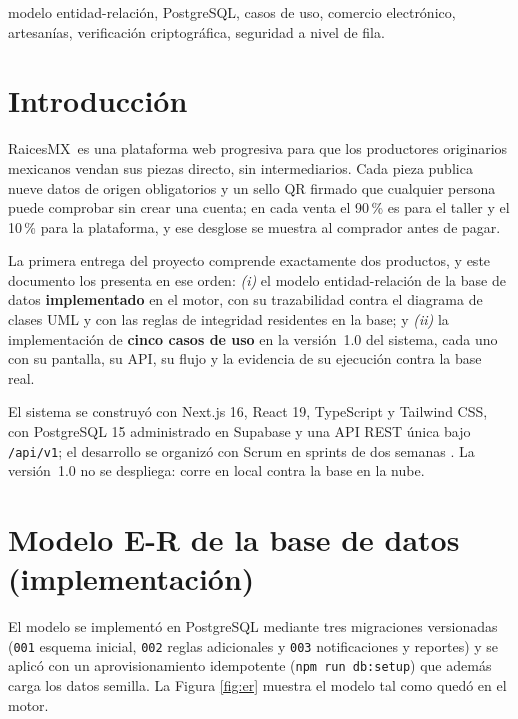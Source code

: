 \documentclass[conference,letterpaper,onecolumn]{IEEEtran}
\newcommand{\Proyecto}{RaicesMX}
\begin{document}
\begin{IEEEkeywords}
modelo entidad-relación, PostgreSQL, casos de uso, comercio electrónico, artesanías,
verificación criptográfica, seguridad a nivel de fila.
\end{IEEEkeywords}

\section{Introducción}

\Proyecto\ es una plataforma web progresiva para que los productores originarios
mexicanos vendan sus piezas directo, sin intermediarios. Cada pieza publica nueve
datos de origen obligatorios y un sello QR firmado que cualquier persona puede
comprobar sin crear una cuenta; en cada venta el 90\,\% es para el taller y el
10\,\% para la plataforma, y ese desglose se muestra al comprador antes de pagar.

La primera entrega del proyecto comprende exactamente dos productos, y este documento
los presenta en ese orden: \emph{(i)} el modelo entidad-relación de la base de datos
\textbf{implementado} en el motor, con su trazabilidad contra el diagrama de clases
UML y con las reglas de integridad residentes en la base; y \emph{(ii)} la
implementación de \textbf{cinco casos de uso} en la versión~1.0 del sistema, cada uno
con su pantalla, su API, su flujo y la evidencia de su ejecución contra la base real.

El sistema se construyó con Next.js 16, React 19, TypeScript y Tailwind CSS, con
PostgreSQL 15 administrado en Supabase y una API REST única bajo \texttt{/api/v1};
el desarrollo se organizó con Scrum en sprints de dos semanas \cite{propuesta}. La
versión~1.0 no se despliega: corre en local contra la base en la nube.

\section{Modelo E-R de la base de datos (implementación)}

El modelo se implementó en PostgreSQL mediante tres migraciones versionadas
(\texttt{001} esquema inicial, \texttt{002} reglas adicionales y \texttt{003}
notificaciones y reportes) y se aplicó con un aprovisionamiento idempotente
(\texttt{npm run db:setup}) que además carga los datos semilla. La Figura
\ref{fig:er} muestra el modelo tal como quedó en el motor.
\end{document}
